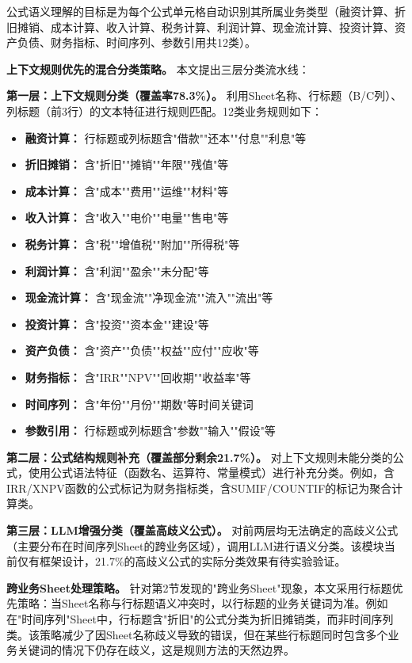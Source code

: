 公式语义理解的目标是为每个公式单元格自动识别其所属业务类型（融资计算、折旧摊销、成本计算、收入计算、税务计算、利润计算、现金流计算、投资计算、资产负债、财务指标、时间序列、参数引用共12类）。

\textbf{上下文规则优先的混合分类策略。} 本文提出三层分类流水线：

\textbf{第一层：上下文规则分类（覆盖率78.3\%）。} 利用Sheet名称、行标题（B/C列）、列标题（前3行）的文本特征进行规则匹配。12类业务规则如下：

\begin{itemize}
	\item \textbf{融资计算：} 行标题或列标题含"借款""还本""付息""利息"等
	\item \textbf{折旧摊销：} 含"折旧""摊销""年限""残值"等
	\item \textbf{成本计算：} 含"成本""费用""运维""材料"等
	\item \textbf{收入计算：} 含"收入""电价""电量""售电"等
	\item \textbf{税务计算：} 含"税""增值税""附加""所得税"等
	\item \textbf{利润计算：} 含"利润""盈余""未分配"等
	\item \textbf{现金流计算：} 含"现金流""净现金流""流入""流出"等
	\item \textbf{投资计算：} 含"投资""资本金""建设"等
	\item \textbf{资产负债：} 含"资产""负债""权益""应付""应收"等
	\item \textbf{财务指标：} 含"IRR""NPV""回收期""收益率"等
	\item \textbf{时间序列：} 含"年份""月份""期数"等时间关键词
	\item \textbf{参数引用：} 行标题或列标题含"参数""输入""假设"等
\end{itemize}

\textbf{第二层：公式结构规则补充（覆盖部分剩余21.7\%）。} 对上下文规则未能分类的公式，使用公式语法特征（函数名、运算符、常量模式）进行补充分类。例如，含IRR/XNPV函数的公式标记为财务指标类，含SUMIF/COUNTIF的标记为聚合计算类。

\textbf{第三层：LLM增强分类（覆盖高歧义公式）。} 对前两层均无法确定的高歧义公式（主要分布在时间序列Sheet的跨业务区域），调用LLM进行语义分类。该模块当前仅有框架设计，21.7\%的高歧义公式的实际分类效果有待实验验证。

\textbf{跨业务Sheet处理策略。} 针对第2节发现的"跨业务Sheet"现象，本文采用行标题优先策略：当Sheet名称与行标题语义冲突时，以行标题的业务关键词为准。例如在"时间序列"Sheet中，行标题含"折旧"的公式分类为折旧摊销类，而非时间序列类。该策略减少了因Sheet名称歧义导致的错误，但在某些行标题同时包含多个业务关键词的情况下仍存在歧义，这是规则方法的天然边界。
